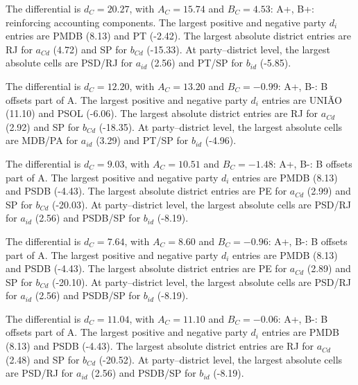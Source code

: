 \begin{description}[style=nextline,leftmargin=3em,labelindent=0pt]
\item[\textbf{Cabinet 2014/14-05}]
The differential is \(d_C=20.27\), with \(A_C=15.74\) and \(B_C=4.53\): A+, B+: reinforcing accounting components. The largest positive and negative party \(d_i\) entries are PMDB (8.13) and PT (-2.42). The largest absolute district entries are RJ for \(a_{Cd}\) (4.72) and SP for \(b_{Cd}\) (-15.33). At party--district level, the largest absolute cells are PSD/RJ for \(a_{id}\) (2.56) and PT/SP for \(b_{id}\) (-5.85).
\item[\textbf{Cabinet 2022/22-01}]
The differential is \(d_C=12.20\), with \(A_C=13.20\) and \(B_C=-0.99\): A+, B-: B offsets part of A. The largest positive and negative party \(d_i\) entries are UNIÃO (11.10) and PSOL (-6.06). The largest absolute district entries are RJ for \(a_{Cd}\) (2.92) and SP for \(b_{Cd}\) (-18.35). At party--district level, the largest absolute cells are MDB/PA for \(a_{id}\) (3.29) and PT/SP for \(b_{id}\) (-4.96).
\item[\textbf{Ideological 2014/5-16 PSB-PTN}]
The differential is \(d_C=9.03\), with \(A_C=10.51\) and \(B_C=-1.48\): A+, B-: B offsets part of A. The largest positive and negative party \(d_i\) entries are PMDB (8.13) and PSDB (-4.43). The largest absolute district entries are PE for \(a_{Cd}\) (2.99) and SP for \(b_{Cd}\) (-20.03). At party--district level, the largest absolute cells are PSD/RJ for \(a_{id}\) (2.56) and PSDB/SP for \(b_{id}\) (-8.19).
\item[\textbf{Ideological 2014/5-17 PSB-PRTB}]
The differential is \(d_C=7.64\), with \(A_C=8.60\) and \(B_C=-0.96\): A+, B-: B offsets part of A. The largest positive and negative party \(d_i\) entries are PMDB (8.13) and PSDB (-4.43). The largest absolute district entries are PE for \(a_{Cd}\) (2.89) and SP for \(b_{Cd}\) (-20.10). At party--district level, the largest absolute cells are PSD/RJ for \(a_{id}\) (2.56) and PSDB/SP for \(b_{id}\) (-8.19).
\item[\textbf{Ideological 2014/7-20 PV-PR}]
The differential is \(d_C=11.04\), with \(A_C=11.10\) and \(B_C=-0.06\): A+, B-: B offsets part of A. The largest positive and negative party \(d_i\) entries are PMDB (8.13) and PSDB (-4.43). The largest absolute district entries are RJ for \(a_{Cd}\) (2.48) and SP for \(b_{Cd}\) (-20.52). At party--district level, the largest absolute cells are PSD/RJ for \(a_{id}\) (2.56) and PSDB/SP for \(b_{id}\) (-8.19).
\item[\textbf{Ideological 2014/8-20 PTB-PR}]

\end{description}
